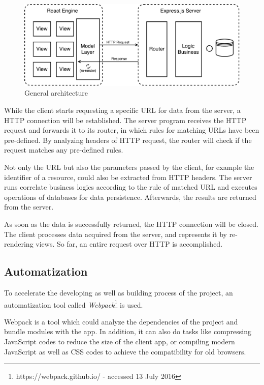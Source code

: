 \begin{figure}[!htbp]
  \centering
    \includegraphics[width=1\textwidth]{Figures/imp-general-arch.pdf}
  \caption{General architecture}
  \label{fig:general-arch-imp}
\end{figure}
While the client starts requesting a specific URL for data from the server, a HTTP connection will be established. The server program receives the HTTP request and forwards it to its router, in which rules for matching URLs have been pre-defined. By analyzing headers of HTTP request, the router will check if the request matches any pre-defined rules.

Not only the URL but also the parameters passed by the client, for example the identifier of a resource, could also be extracted from HTTP headers. The server runs correlate business logics according to the rule of matched URL and executes operations of databases for data persistence. Afterwards, the results are returned from the server.

As soon as the data is successfully returned, the HTTP connection will be closed. The client processes data acquired from the server, and represents it by re-rendering views. So far, an entire request over HTTP is accomplished.

\subsection{Automatization}
To accelerate the developing as well as building process of the project, an automatization tool called \textit{Webpack}\footnote{https://webpack.github.io/ - accessed 13 July 2016} is used. 

Webpack is a tool which could analyze the dependencies of the project and bundle modules with the app. In addition, it can also do tasks like compressing JavaScript codes to reduce the size of the client app, or compiling modern JavaScript as well as CSS codes to achieve the compatibility for old browsers.

